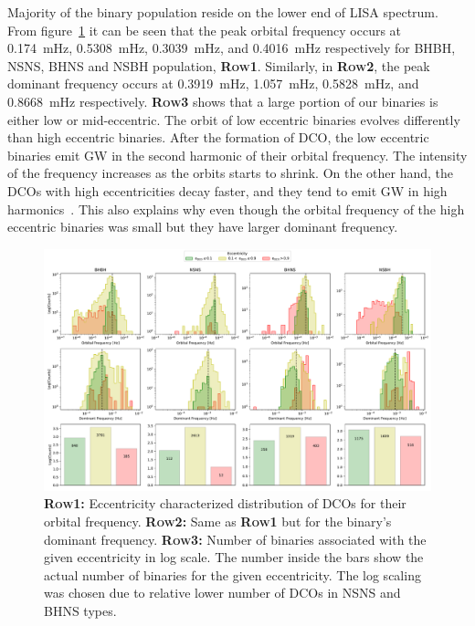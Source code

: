 \documentclass[twocolumn, twocolappendix]{aastex63}
\begin{document}
Majority of the binary population reside on the lower end of LISA spectrum.
From figure~\ref{fig:dcofdomeccdetails} it can be seen that the peak orbital frequency occurs at \SI{0.174}{\milli\hertz}, \SI{0.5308}{\milli\hertz}, \SI{0.3039}{\milli\hertz}, and \SI{0.4016}{\milli\hertz} respectively for BHBH, NSNS, BHNS and NSBH population, \textsc{\textbf{Row1}}.
Similarly, in \textsc{\textbf{Row2}}, the peak dominant frequency occurs at \SI{0.3919}{\milli\hertz}, \SI{1.057}{\milli\hertz}, \SI{0.5828}{\milli\hertz}, and \SI{0.8668}{\milli\hertz} respectively.
\textsc{\textbf{Row3}} shows that a large portion of our binaries is either low or mid-eccentric.
The orbit of low eccentric binaries evolves differently than high eccentric binaries.
After the formation of DCO, the low eccentric binaries emit GW in the second harmonic of their orbital frequency.
The intensity of the frequency increases as the orbits starts to shrink.
On the other hand, the DCOs with high eccentricities decay faster, and they tend to emit GW in high harmonics~\citep{Peters1963, Peters1964}.
This also explains why even though the orbital frequency of the high eccentric binaries was small but they have larger dominant frequency.

\begin{figure}[!h]%
	\centering
	\includegraphics[width=\columnwidth]{analysis_data/004__images_for_latex/dco_fdom_ecc_details}
	\caption{\textsc{\textbf{Row1:}} Eccentricity characterized distribution of DCOs for their orbital frequency. \textsc{\textbf{Row2:}} Same as \textsc{\textbf{Row1}} but for the binary's dominant frequency. \textsc{\textbf{Row3:}} Number of binaries associated with the given eccentricity in log scale. The number inside the bars show the actual number of binaries for the given eccentricity. The log scaling was chosen due to relative lower number of DCOs in NSNS and BHNS types.}
	\label{fig:dcofdomeccdetails}
\end{figure}%
\end{document}
